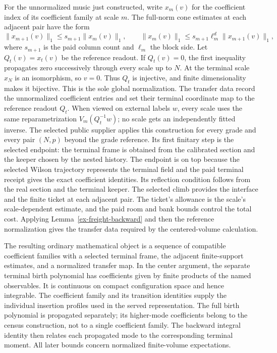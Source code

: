 For the unnormalized music just constructed, write $x_m(v)$ for the coefficient index of its coefficient family at scale $m$. The full-norm cone estimates at each adjacent pair have the form
\[
 \|x_{m+1}(v)\|_1\leq s_{m+1}\|x_m(v)\|_1,
 \qquad
 \|x_m(v)\|_1\leq s_{m+1}\ell_m^d\|x_{m+1}(v)\|_1,
\]
where $s_{m+1}$ is the paid column count and $\ell_m$ the block side. Let $Q_t(v)=x_t(v)$ be the reference readout. If $Q_t(v)=0$, the first inequality propagates zero successively through every scale up to $N$. At the terminal scale $x_N$ is an isomorphism, so $v=0$. Thus $Q_t$ is injective, and finite dimensionality makes it bijective. This is the sole global normalization. The transfer data record the unnormalized coefficient entries and set their terminal coordinate map to the reference readout $Q_t$. When viewed on external labels $w$, every scale uses the same reparametrization $V_m(Q_t^{-1}w)$; no scale gets an independently fitted inverse.
The selected public supplier applies this construction for every grade and every pair $(N,p)$ beyond the grade reference. Its first finitary step is the selected endpoint: the terminal frame is obtained from the calibrated section and the keeper chosen by the nested history. The endpoint is on top because the selected Wilson trajectory represents the terminal field and the paid terminal receipt gives the exact coefficient identities. Its reflection condition follows from the real section and the terminal keeper. The selected climb provides the interface and the finite ticket at each adjacent pair. The ticket's allowance is the scale's scale-dependent estimate, and the paid room and bank bounds control the total cost. Applying Lemma~\ref{ex-freight-backward} and then the reference normalization gives the transfer data required by the centered-volume calculation.

The resulting ordinary mathematical object is a sequence of compatible coefficient families with a selected terminal frame, the adjacent finite-support estimates, and a normalized transfer map. In the center argument, the separate terminal birth polynomial has coefficients given by finite products of the named observables. It is continuous on compact configuration space and hence integrable. The coefficient family and its transition identities supply the individual insertion profiles used in the served representation. The full birth polynomial is propagated separately; its higher-mode coefficients belong to the census construction, not to a single coefficient family. The backward integral identity then relates each propagated mode to the corresponding terminal moment. All later bounds concern normalized finite-volume expectations.

